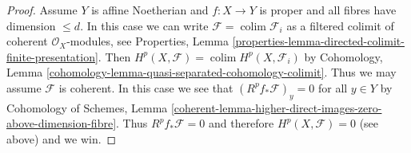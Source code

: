\documentclass[10pt,a4paper]{amsart}
\theoremstyle{plain}
\theoremstyle{definition}
\theoremstyle{remark}
\numberwithin{equation}{subsection}
\def\colim{\mathop{\mathrm{colim}}\nolimits}
\begin{document}
\begin{proof}
\medskip\noindent
Assume $Y$ is affine Noetherian and $f : X \to Y$ is proper
and all fibres have dimension $\leq d$.
In this case we can write $\mathcal{F} = \colim \mathcal{F}_i$
as a filtered colimit of coherent $\mathcal{O}_X$-modules, see
Properties, Lemma
\ref{properties-lemma-directed-colimit-finite-presentation}.
Then $H^p(X, \mathcal{F}) = \colim H^p(X, \mathcal{F}_i)$ by
Cohomology, Lemma \ref{cohomology-lemma-quasi-separated-cohomology-colimit}.
Thus we may assume $\mathcal{F}$ is coherent.
In this case we see that $(R^pf_*\mathcal{F})_y = 0$ for
all $y \in Y$ by Cohomology of Schemes, Lemma
\ref{coherent-lemma-higher-direct-images-zero-above-dimension-fibre}.
Thus $R^pf_*\mathcal{F} = 0$ and therefore
$H^p(X, \mathcal{F}) = 0$ (see above) and we win.
\end{proof}
\end{document}
